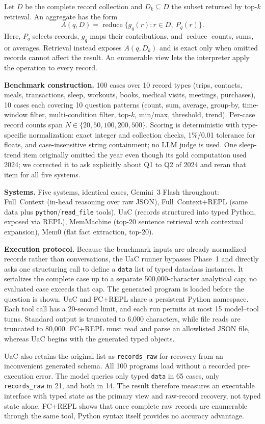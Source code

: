 \documentclass[letterpaper]{article} %
\begin{document}
Let $D$ be the complete record collection and $D_k\subseteq D$ the subset returned by top-$k$ retrieval. An aggregate has the form
\[
A(q,D)=\operatorname{reduce}\{g_q(r):r\in D,\ P_q(r)\}.
\]
Here, $P_q$ selects records, $g_q$ maps their contributions, and $\operatorname{reduce}$ counts, sums, or averages. Retrieval instead exposes $A(q,D_k)$ and is exact only when omitted records cannot affect the result. An enumerable view lets the interpreter apply the operation to every record.

\textbf{Benchmark construction.} 100 cases over 10 record types (trips, contacts, meals, transactions, sleep, workouts, books, medical visits, meetings, purchases), 10 cases each covering 10 question patterns (count, sum, average, group-by, time-window filter, multi-condition filter, top-$k$, min/max, threshold, trend). Per-case record counts span $N \in \{20, 50, 100, 200, 500\}$. Scoring is deterministic with type-specific normalization: exact integer and collection checks, 1\%/0.01 tolerance for floats, and case-insensitive string containment; no LLM judge is used. One sleep-trend item originally omitted the year even though its gold computation used 2024; we corrected it to ask explicitly about Q1 to Q2 of 2024 and reran that item for all five systems.

\textbf{Systems.} Five systems, identical cases, Gemini~3 Flash throughout: Full~Context (in-head reasoning over raw JSON), Full~Context+REPL (same data plus \texttt{python}/\texttt{read\_file} tools), UaC (records structured into typed Python, exposed via REPL), MemMachine (top-20 sentence retrieval with contextual expansion), Mem0 (flat fact extraction, top-20).

\textbf{Execution protocol.} Because the benchmark inputs are already normalized records rather than conversations, the UaC runner bypasses Phase~1 and directly asks one structuring call to define a \texttt{data} list of typed dataclass instances. It serializes the complete case up to a separate 500{,}000-character analytical cap; no evaluated case exceeds that cap. The generated program is loaded before the question is shown. UaC and FC+REPL share a persistent Python namespace. Each tool call has a 20-second limit, and each run permits at most 15 model--tool turns. Standard output is truncated to 6,000 characters, while file reads are truncated to 80,000. FC+REPL must read and parse an allowlisted JSON file, whereas UaC begins with the generated typed objects.

UaC also retains the original list as \texttt{records\_raw} for recovery from an inconvenient generated schema. All 100 programs load without a recorded pre-execution error. The model queries only typed \texttt{data} in 65 cases, only \texttt{records\_raw} in 21, and both in 14. The result therefore measures an executable interface with typed state as the primary view and raw-record recovery, not typed state alone. FC+REPL shows that once complete raw records are enumerable through the same tool, Python syntax itself provides no accuracy advantage.
\end{document}
